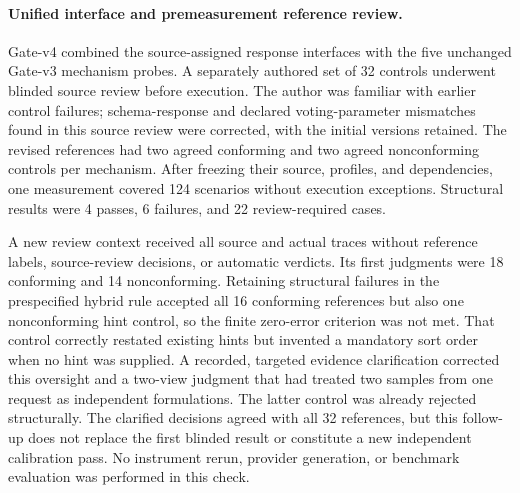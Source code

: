 \paragraph{Unified interface and premeasurement reference review.}
Gate-v4 combined the source-assigned response interfaces with the five unchanged
Gate-v3 mechanism probes. A separately authored set of 32 controls underwent
blinded source review before execution. The author was familiar with earlier
control failures; schema-response and declared voting-parameter mismatches found
in this source review were corrected, with the initial versions retained.
The revised references had two agreed conforming and two agreed nonconforming
controls per mechanism. After freezing their source, profiles, and dependencies,
one measurement covered 124 scenarios without execution exceptions. Structural
results were 4 passes, 6 failures, and 22 review-required cases.

A new review context received all source and actual traces without reference
labels, source-review decisions, or automatic verdicts. Its first judgments
were 18 conforming and 14 nonconforming. Retaining structural failures in the
prespecified hybrid rule accepted all 16 conforming references but also one
nonconforming hint control, so the finite zero-error criterion was not met.
That control correctly restated existing hints but invented a mandatory sort
order when no hint was supplied. A recorded, targeted evidence clarification
corrected this oversight and a two-view judgment that had treated two samples
from one request as independent formulations. The latter control was already
rejected structurally. The clarified decisions agreed with all 32 references,
but this follow-up does not replace the first blinded result or constitute
a new independent calibration pass. No instrument rerun, provider generation,
or benchmark evaluation was performed in this check.
